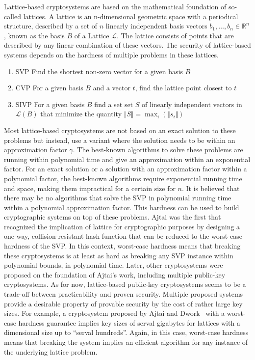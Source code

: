 Lattice-based cryptosystems are based on the mathematical foundation of so-called lattices. A lattice is an n-dimensional geometric space with a periodical structure, described by a set of \(n\) linearly independent basis vectors \(b_1, \dots, b_n \in \mathbb{R}^n\), known as the basis \(B\) of a Lattice \(\mathcal{L}\). The lattice consists of points that are described by any linear combination of these vectors. The security of lattice-based systems depends on the hardness of multiple problems in these lattices\cite{micciancio2009lattice}.

\begin{enumerate}
    \setlength{\itemsep}{0pt}
    \item \ac{SVP} Find the shortest non-zero vector for a given basis \(B\)
    \item \ac{CVP} For a given basis \(B\) and a vector \(t\), find the lattice point closest to \(t\)
    \item \ac{SIVP} For a given basis \(B\) find a set set \(S\) of linearly independent vectors in \(\mathcal{L}(B)\) that minimize the quantity \(\Vert S \Vert = \max_i(\Vert s_i \Vert)\)
\end{enumerate}

Most lattice-based cryptosystems are not based on an exact solution to these problems but instead, use a variant where the solution needs to be within an approximation factor \(\gamma\). The best-known algorithms to solve these problems are running within polynomial time and give an approximation within an exponential factor. For an exact solution or a solution with an approximation factor within a polynomial factor, the best-known algorithms require exponential running time and space, making them impractical for a certain size for \(n\)\cite{micciancio2009lattice}. It is believed that there may be no algorithms that solve the \ac{SVP} in polynomial running time within a polynomial approximation factor. This hardness can be used to build cryptographic systems on top of these problems. Ajtai was the first that recognized the implication of lattice for cryptographic purposes by designing a one-way, collision-resistant hash function that can be reduced to the worst-case hardness of the \ac{SVP}\cite{ajtai1996generating}. In this context, worst-case hardness means that breaking these cryptosystems is at least as hard as breaking any \ac{SVP} instance within polynomial bounds, in polynomial time. Later, other cryptosystems were proposed on the foundation of Ajtai's work, including multiple public-key cryptosystems. As for now, lattice-based public-key cryptosystems seems to be a trade-off between practicability and proven security. Multiple proposed systems provide a desirable property of provable security by the cost of rather large key sizes. For example, a cryptosystem proposed by Ajtai and Dwork~\cite{ajtai1997public} with a worst-case hardness guarantee implies key sizes of serval gigabytes for lattices with a dimensional size up to ``serval hundreds''\cite{micciancio2009lattice}. Again, in this case, worst-case hardness means that breaking the system implies an efficient algorithm for any instance of the underlying lattice problem.

